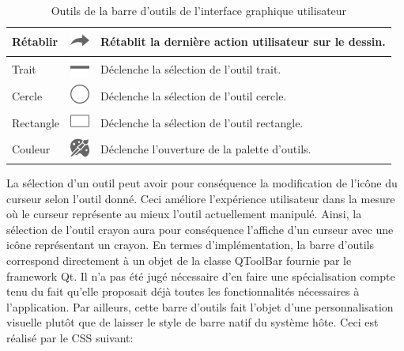 \documentclass[11pt,a4paper,oldfontcommands]{memoir}
\begin{document}
\begin{table}[h]
\begin{tabular}{|l|l|l|}
Rétablir                             & \includegraphics{images/icon-redo.png}                                     & Rétablit la dernière action utilisateur sur le dessin.                                             \\ \hline
Trait                                & \includegraphics{images/icon-dash.png}                                     & Déclenche la sélection de l'outil trait.                                                           \\ \hline
Cercle                               & \includegraphics{images/icon-ellipse.png}                                      & Déclenche la sélection de l'outil cercle.                                                          \\ \hline
Rectangle                            & \includegraphics{images/icon-rectangle.png}                                      & Déclenche la sélection de l'outil rectangle.                                                       \\ \hline
Couleur                              & \includegraphics{images/icon-color.png}                                      & Déclenche l'ouverture de la palette d'outils.                                                      \\ \hline
\end{tabular}
\caption{Outils de la barre d'outils de l'interface graphique utilisateur}
\end{table}

La sélection d'un outil peut avoir pour conséquence la modification de l'icône du curseur selon l'outil donné. Ceci améliore l'expérience utilisateur dans la mesure où le curseur représente au mieux l'outil actuellement manipulé. Ainsi, la sélection de l'outil crayon aura pour conséquence l'affiche d'un curseur avec une icône représentant un crayon. En termes d'implémentation, la barre d'outils correspond directement à un objet de la classe QToolBar fournie par le framework Qt. Il n'a pas été jugé nécessaire d'en faire une spécialisation compte tenu du fait qu'elle proposait déjà toutes les fonctionnalités nécessaires à l'application. Par ailleurs, cette barre d'outils fait l'objet d'une personnalisation visuelle plutôt que de laisser le style de barre natif du système hôte. Ceci est réalisé par le CSS suivant:
\end{document}
